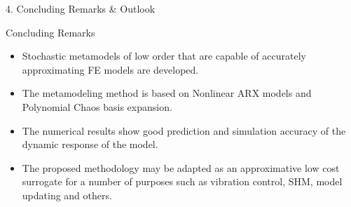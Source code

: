 \documentclass[10pt,xcolor = dvipsnames]{beamer}
\newcommand{\vc}[1]{\vspace*{#1cm}}
\newcommand{\Blue}{\color{blue}}
\newcommand{\Red}{\color{red}}
\begin{document}
\begin{frame}[t]{4. Concluding Remarks \& Outlook}

\vc{0.1}
\begin{block}{Concluding Remarks}

{\small \begin{itemize}
\itemsep 0pt
\item{Stochastic {\Red metamodels} of low order that are capable of accurately approximating {\Blue FE models} are developed.}
\item{The {\Red metamodeling method} is based on {\Blue Nonlinear ARX} models and {\Blue Polynomial Chaos} basis expansion.}
\item{The numerical results show good {\Blue prediction} and {\Blue simulation} accuracy of the dynamic response of the model.}
\item{The proposed methodology may be adapted as an approximative {\Blue low cost surrogate} for a number of purposes such as {\Red vibration control}, {\Red SHM}, {\Red model updating} and others.}
\end{itemize}}

\end{block}





\end{frame}
\end{document}
